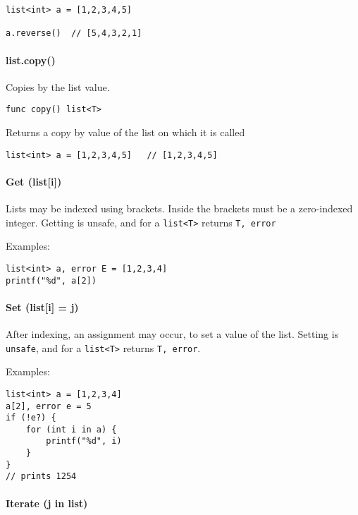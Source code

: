 \begin{verbatim}
list<int> a = [1,2,3,4,5]

a.reverse()  // [5,4,3,2,1]
\end{verbatim}

\paragraph{list.copy()}\label{list.copy}

Copies by the list value.

\begin{verbatim}
func copy() list<T>
\end{verbatim}

Returns a copy by value of the list on which it is called

\begin{verbatim}
list<int> a = [1,2,3,4,5]   // [1,2,3,4,5]
\end{verbatim}

\paragraph{Get (list{[}i{]})}\label{get-listi}

Lists may be indexed using brackets. Inside the brackets must be a
zero-indexed integer. Getting is unsafe, and for a
\texttt{list\textless{}T\textgreater{}} returns \texttt{T, error}

Examples:

\begin{verbatim}
list<int> a, error E = [1,2,3,4]
printf("%d", a[2])
\end{verbatim}

\paragraph{Set (list{[}i{]} = j)}\label{set-listi-j}

After indexing, an assignment may occur, to set a value of the list.
Setting is \texttt{unsafe}, and for a
\texttt{list\textless{}T\textgreater{}} returns \texttt{T, error}.

Examples:

\begin{verbatim}
list<int> a = [1,2,3,4]
a[2], error e = 5
if (!e?) {
    for (int i in a) {
        printf("%d", i)
    }
}
// prints 1254
\end{verbatim}

\paragraph{Iterate (j in list)}\label{iterate-j-in-list}

